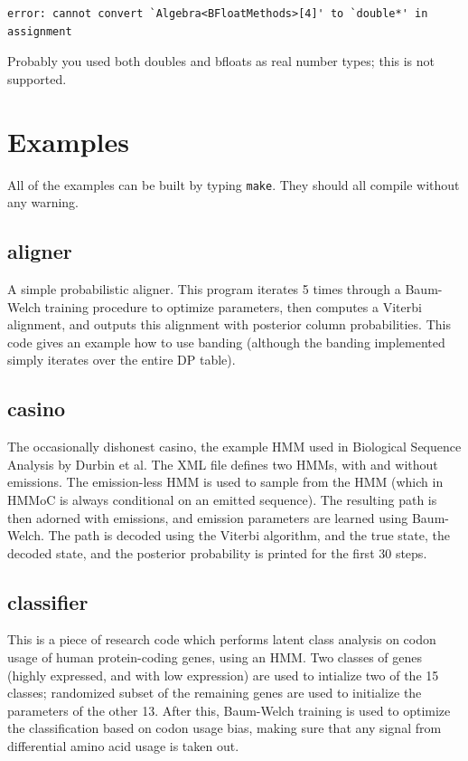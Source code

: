 \documentclass{article}
\begin{document}
\begin{verbatim}
error: cannot convert `Algebra<BFloatMethods>[4]' to `double*' in assignment
\end{verbatim}

Probably you used both doubles and bfloats as real number types; this is not supported.




\section{Examples}

All of the examples can be built by typing {\tt make}.  They should all compile without any warning.

\subsection{aligner}

A simple probabilistic aligner.  This program iterates 5 times through a Baum-Welch training procedure 
to optimize parameters, then computes a Viterbi alignment, and outputs this alignment with posterior
column probabilities.  This code gives an example how to use banding (although the banding implemented
simply iterates over the entire DP table).

\subsection{casino}

The occasionally dishonest casino, the example HMM used in Biological Sequence Analysis by Durbin et al.
The XML file defines two HMMs, with and without emissions.  The emission-less HMM is used to sample
from the HMM (which in HMMoC is always conditional on an emitted sequence).  The resulting path is
then adorned with emissions, and emission parameters are learned using Baum-Welch.  The path is 
decoded using the Viterbi algorithm, and the true state, the decoded state, and the posterior
probability is printed for the first 30 steps.

\subsection{classifier}

This is a piece of research code which performs latent class analysis on codon usage of human
protein-coding genes, using an HMM.  Two classes of genes (highly expressed, and with low expression)
are used to intialize two of the 15 classes; randomized subset of the remaining genes are used to
initialize the parameters of the other 13.  After this, Baum-Welch training is used to optimize the
classification based on codon usage bias, making sure that any signal from differential amino acid
usage is taken out.
\end{document}
